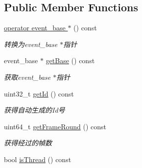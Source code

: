 \subsection*{Public Member Functions}
\begin{DoxyCompactItemize}
\item 
\hypertarget{classec_1_1Loop_ab104699b3b40815f32e5272e85fb01d7}{\hyperlink{classec_1_1Loop_ab104699b3b40815f32e5272e85fb01d7}{operator event\-\_\-base $\ast$} () const }\label{classec_1_1Loop_ab104699b3b40815f32e5272e85fb01d7}

\begin{DoxyCompactList}\small\item\em 转换为event\-\_\-base $\ast$指针 \end{DoxyCompactList}\item 
\hypertarget{classec_1_1Loop_af4830e98d557cb3be841f8aa3e9c588b}{event\-\_\-base $\ast$ \hyperlink{classec_1_1Loop_af4830e98d557cb3be841f8aa3e9c588b}{get\-Base} () const }\label{classec_1_1Loop_af4830e98d557cb3be841f8aa3e9c588b}

\begin{DoxyCompactList}\small\item\em 获取event\-\_\-base $\ast$指针 \end{DoxyCompactList}\item 
\hypertarget{classec_1_1Loop_a57deb8ad44ad522dc64f37e6ceef6595}{uint32\-\_\-t \hyperlink{classec_1_1Loop_a57deb8ad44ad522dc64f37e6ceef6595}{get\-Id} () const }\label{classec_1_1Loop_a57deb8ad44ad522dc64f37e6ceef6595}

\begin{DoxyCompactList}\small\item\em 获得自动生成的\-Id号 \end{DoxyCompactList}\item 
\hypertarget{classec_1_1Loop_adc30b5686fd9fb9b820868af4ffea513}{uint64\-\_\-t \hyperlink{classec_1_1Loop_adc30b5686fd9fb9b820868af4ffea513}{get\-Frame\-Round} () const }\label{classec_1_1Loop_adc30b5686fd9fb9b820868af4ffea513}

\begin{DoxyCompactList}\small\item\em 获得经过的幀数 \end{DoxyCompactList}\item 
\hypertarget{classec_1_1Loop_a134b0eb8eaa83270eb375df11160bea5}{bool \hyperlink{classec_1_1Loop_a134b0eb8eaa83270eb375df11160bea5}{is\-Thread} () const }\label{classec_1_1Loop_a134b0eb8eaa83270eb375df11160bea5}


\end{DoxyCompactItemize}
